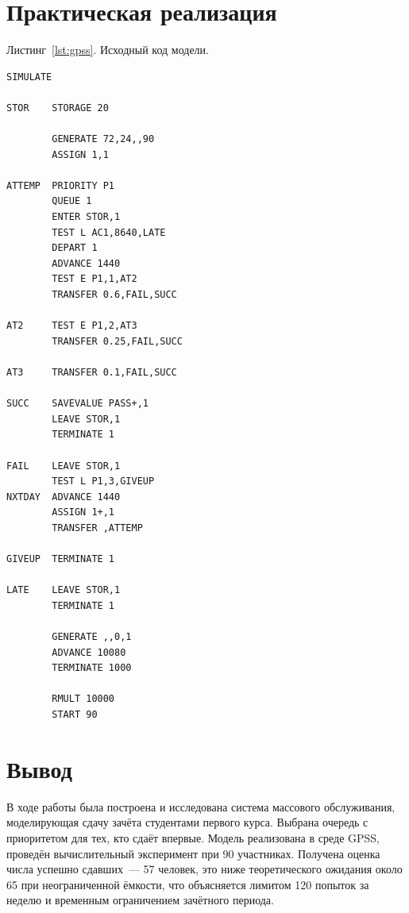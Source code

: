 \documentclass[a4paper, 14pt]{extarticle}
\begin{document}
\section{Практическая реализация}

\label{lst:gpss}
Листинг~\ref{lst:gpss}. Исходный код модели.

\begin{lstlisting}
SIMULATE

STOR    STORAGE 20

        GENERATE 72,24,,90
        ASSIGN 1,1

ATTEMP  PRIORITY P1
        QUEUE 1
        ENTER STOR,1
        TEST L AC1,8640,LATE
        DEPART 1
        ADVANCE 1440
        TEST E P1,1,AT2
        TRANSFER 0.6,FAIL,SUCC

AT2     TEST E P1,2,AT3
        TRANSFER 0.25,FAIL,SUCC

AT3     TRANSFER 0.1,FAIL,SUCC

SUCC    SAVEVALUE PASS+,1
        LEAVE STOR,1
        TERMINATE 1

FAIL    LEAVE STOR,1
        TEST L P1,3,GIVEUP
NXTDAY  ADVANCE 1440
        ASSIGN 1+,1
        TRANSFER ,ATTEMP

GIVEUP  TERMINATE 1

LATE    LEAVE STOR,1
        TERMINATE 1

        GENERATE ,,0,1
        ADVANCE 10080
        TERMINATE 1000

        RMULT 10000
        START 90
\end{lstlisting}

\section{Вывод}

В ходе работы была построена и исследована система массового обслуживания, моделирующая сдачу зачёта студентами первого курса. Выбрана очередь с приоритетом для тех, кто сдаёт впервые. Модель реализована в среде GPSS, проведён вычислительный эксперимент при 90 участниках. Получена оценка числа успешно сдавших~--- 57 человек, это ниже теоретического ожидания около 65 при неограниченной ёмкости, что объясняется лимитом 120 попыток за неделю и временным ограничением зачётного периода.
\end{document}

